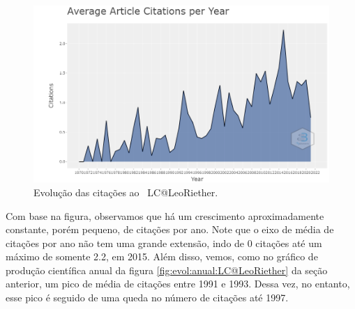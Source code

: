 \begin{figure}
    \centering
    \includegraphics[width=1\textwidth]{experiments/LeoRiether/AnaliseBibliometrica/LambdaCalculus/WoS-20220208/Images/AverageCitationsPerYear.png}
    \caption{Evolução das citações ao \dataset\   LC@LeoRiether.}
    \label{fig:evol:anual:citacoes:LC@LeoRiether}
\end{figure}

Com base na figura, observamos que há um crescimento aproximadamente constante, porém pequeno, de citações por ano. Note que o eixo de média de citações por ano não tem uma grande extensão, indo de 0 citações até um máximo de somente 2.2, em 2015. Além disso, vemos, como no gráfico de produção científica anual da figura \ref{fig:evol:anual:LC@LeoRiether} da seção anterior, um pico de média de citações entre 1991 e 1993. Dessa vez, no entanto, esse pico é seguido de uma queda no número de citações até 1997.

